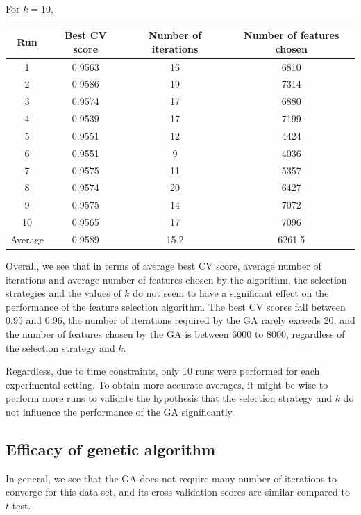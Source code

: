 \documentclass[12pt, twoside, a4paper]{report}
\begin{document}
For $k=10$,
\begin{center}
    \begin{tabular}{| c | c | c | c | } \hline
    Run & Best CV score & Number of iterations & Number of features chosen \\ \hline \hline
    1 & 0.9563 & 16 & 6810 \\ \hline
	2 & 0.9586 & 19 & 7314 \\ \hline
	3 & 0.9574 & 17 & 6880 \\ \hline
	4 & 0.9539 & 17 & 7199 \\ \hline
	5 & 0.9551 & 12 & 4424 \\ \hline
	6 & 0.9551 & 9 & 4036 \\ \hline
	7 & 0.9575 & 11 & 5357 \\ \hline
	8 & 0.9574 & 20 & 6427 \\ \hline
	9 & 0.9575 & 14 & 7072 \\ \hline
	10 & 0.9565 & 17 & 7096 \\ \hline
	Average & 0.9589 & 15.2 & 6261.5 \\ \hline
    \end{tabular}
\end{center}


Overall, we see that in terms of average best CV score, average number of iterations and average number of features chosen by the algorithm, the selection strategies and the values of $k$ do not seem to have a significant effect on the performance of the feature selection algorithm. The best CV scores fall between 0.95 and 0.96, the number of iterations required by the GA rarely exceeds 20, and the number of features chosen by the GA is between 6000 to 8000, regardless of the selection strategy and $k$.

Regardless, due to time constraints, only 10 runs were performed for each experimental setting. To obtain more accurate averages, it might be wise to perform more runs to validate the hypothesis that the selection strategy and $k$ do not influence the performance of the GA significantly.

\subsection{Efficacy of genetic algorithm}

In general, we see that the GA does not require many number of iterations to converge for this data set, and its cross validation scores are similar compared to $t$-test.
\end{document}
